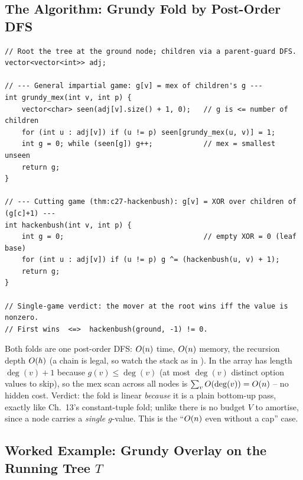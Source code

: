 \subsection{The Algorithm: Grundy Fold by Post-Order DFS}

\begin{lstlisting}[caption={Generic Grundy fold (mex over children) and the Hackenbush shortcut (xor of child+1); both are one post-order pass, same skeleton as \coderef{c27-knap}}, label={lst:c27-grundy}]
// Root the tree at the ground node; children via a parent-guard DFS.
vector<vector<int>> adj;

// --- General impartial game: g[v] = mex of children's g ---
int grundy_mex(int v, int p) {
    vector<char> seen(adj[v].size() + 1, 0);   // g is <= number of children
    for (int u : adj[v]) if (u != p) seen[grundy_mex(u, v)] = 1;
    int g = 0; while (seen[g]) g++;            // mex = smallest unseen
    return g;
}

// --- Cutting game (thm:c27-hackenbush): g[v] = XOR over children of (g[c]+1) ---
int hackenbush(int v, int p) {
    int g = 0;                                 // empty XOR = 0 (leaf base)
    for (int u : adj[v]) if (u != p) g ^= (hackenbush(u, v) + 1);
    return g;
}

// Single-game verdict: the mover at the root wins iff the value is nonzero.
// First wins  <=>  hackenbush(ground, -1) != 0.
\end{lstlisting}

\begin{complexitybox}
Both folds are one post-order DFS: $O(n)$ time, $O(n)$ memory, the recursion
depth $O(h)$ (a chain is legal, so watch the stack as in ).
In  the  array has length $\deg(v) + 1$ because $g(v) \le
\deg(v)$ (at most $\deg(v)$ distinct option values to skip), so the mex scan across all
nodes is $\sum_v O(\deg(v)) = O(n)$ -- no hidden cost. Verdict: the fold is
linear \emph{because} it is a plain bottom-up pass, exactly like Ch.~13's constant-tuple
fold; unlike  there is no budget $V$ to amortise, since a node
carries a \emph{single} $g$-value. This is the ``$O(n)$ even without a cap'' case.
\end{complexitybox}

\subsection{Worked Example: Grundy Overlay on the Running Tree $T$}

